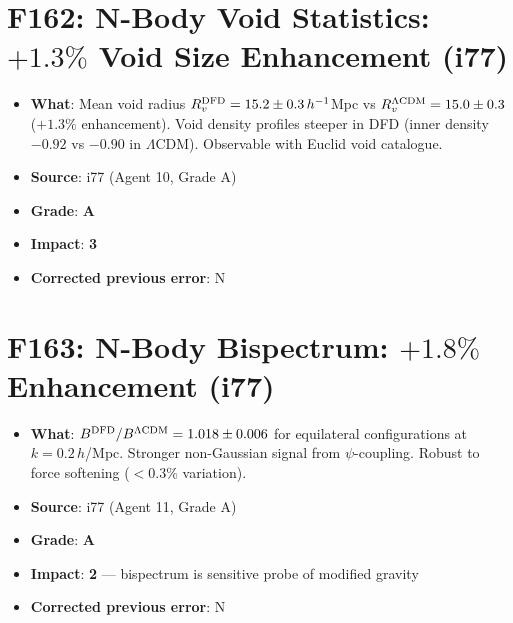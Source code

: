 \documentclass[11pt,a4paper]{article}
\newcommand{\grade}[1]{\textbf{#1}}
\newcommand{\impact}[1]{\textbf{#1}}
\begin{document}
\section{F162: N-Body Void Statistics: $+1.3\%$ Void Size Enhancement (i77)}
\begin{itemize}[nosep]
\item \textbf{What}: Mean void radius $R_v^{\rm DFD} = 15.2 \pm 0.3\,h^{-1}$Mpc vs $R_v^{\Lambda{\rm CDM}} = 15.0 \pm 0.3$ ($+1.3\%$ enhancement). Void density profiles steeper in DFD (inner density $-0.92$ vs $-0.90$ in $\Lambda$CDM). Observable with Euclid void catalogue.
\item \textbf{Source}: i77 (Agent 10, Grade A)
\item \textbf{Grade}: \grade{A}
\item \textbf{Impact}: \impact{3}
\item \textbf{Corrected previous error}: N
\end{itemize}

\section{F163: N-Body Bispectrum: $+1.8\%$ Enhancement (i77)}
\begin{itemize}[nosep]
\item \textbf{What}: $B^{\rm DFD}/B^{\Lambda{\rm CDM}} = 1.018 \pm 0.006$ for equilateral configurations at $k = 0.2\,h$/Mpc. Stronger non-Gaussian signal from $\psi$-coupling. Robust to force softening ($< 0.3\%$ variation).
\item \textbf{Source}: i77 (Agent 11, Grade A)
\item \textbf{Grade}: \grade{A}
\item \textbf{Impact}: \impact{2} --- bispectrum is sensitive probe of modified gravity
\item \textbf{Corrected previous error}: N
\end{itemize}

\end{document}
